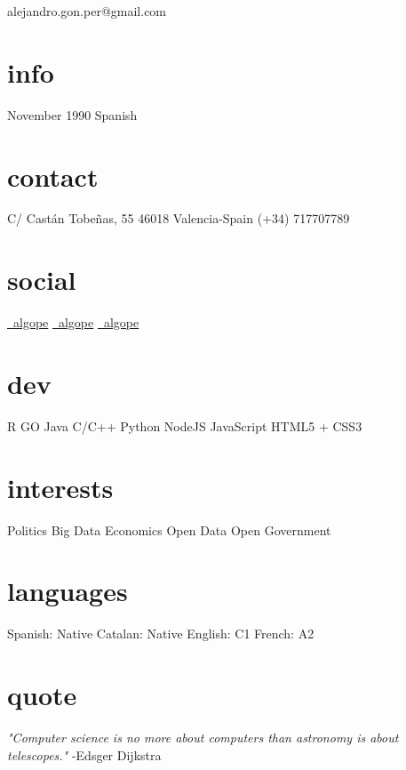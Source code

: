 \documentclass[]{cv}
\begin{document}
       {alejandro.gon.per@gmail.com}


\begin{aside}
	\section{info}
	November 1990
	Spanish
    \section{contact}
        C/ Castán Tobeñas, 55
        46018 Valencia-Spain
        (+34) 717707789
    \section{social}
        \href{https://www.linkedin.com/in/algope}{\faLinkedin\ algope} 
        \href{http://github.com/algope}{\faGithub\ algope}
        \href{http://twitter.com/algope_}{\faTwitter\ algope}
    \section{dev}
        R
        GO
        Java
        C/C++
        Python
        NodeJS
        JavaScript
        HTML5 + CSS3
    \section{interests}
        Politics
        Big Data
        Economics
        Open Data
        Open Government
     \section{languages}
     	Spanish: Native
     	Catalan: Native
     	English: C1
     	French: A2
\end{aside}

\section{quote}
\emph{"Computer science is no more about computers than astronomy is about telescopes."} -Edsger Dijkstra
\end{document}
